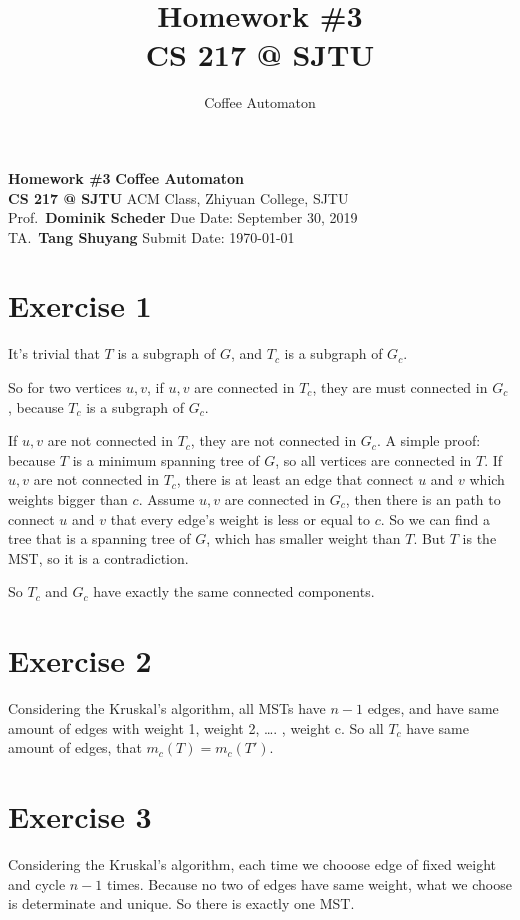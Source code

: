 \documentclass[
]{article}
\title{
  \vspace{2in}
  \textmd{\textbf{Homework \#3}}
  \normalsize\vspace{0.1in}\\
  \textmd{\textbf{CS 217 @ SJTU}}
  \normalsize\vspace{0.1in}\\
}
\author{Coffee Automaton}
\date{}
\begin{document}
\noindent
\large\textbf{Homework \#3}
\hfill
\textbf{Coffee Automaton} \\
\normalsize {\bf CS 217 @ SJTU} \hfill ACM Class, Zhiyuan College, SJTU\\
Prof.~{\bf Dominik Scheder} \hfill Due Date: September 30, 2019\\
  TA.~{\bf Tang Shuyang}
\hfill Submit Date: \today


\hypertarget{exercise-1}{%
\section{Exercise 1}\label{exercise-1}}

It's trivial that \(T\) is a subgraph of \(G\), and \(T_{c}\) is a
subgraph of \(G_{c}\).

So for two vertices \(u,v\), if \(u,v\) are connected in \(T_{c}\), they
are must connected in \(G_{c}\), because \(T_{c}\) is a subgraph of
\(G_{c}\).

If \(u,v\) are not connected in \(T_{c}\), they are not connected in
\(G_{c}\). A simple proof: because \(T\) is a minimum spanning tree of
\(G\), so all vertices are connected in \(T\). If \(u,v\) are not
connected in \(T_{c}\), there is at least an edge that connect \(u\) and
\(v\) which weights bigger than \(c\). Assume \(u,v\) are connected in
\(G_{c}\), then there is an path to connect \(u\) and \(v\) that every
edge's weight is less or equal to \(c\). So we can find a tree that is a
spanning tree of \(G\), which has smaller weight than \(T\). But \(T\)
is the MST, so it is a contradiction.

So \(T_c\) and \(G_c\) have exactly the same connected components.

\hypertarget{exercise-2}{%
\section{Exercise 2}\label{exercise-2}}

Considering the Kruskal's algorithm, all MSTs have \(n-1\) edges, and
have same amount of edges with weight 1, weight 2, \ldots{}. , weight c.
So all \(T_c\) have same amount of edges, that \(m_{c}(T) = m_{c}(T')\).

\hypertarget{exercise-3}{%
\section{Exercise 3}\label{exercise-3}}

Considering the Kruskal's algorithm, each time we chooose edge of fixed
weight and cycle \(n-1\) times. Because no two of edges have same
weight, what we choose is determinate and unique. So there is exactly
one MST.
\end{document}
